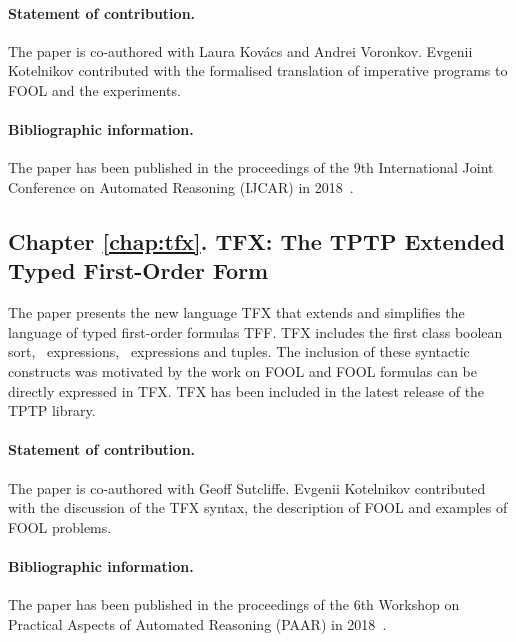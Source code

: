 \paragraph{Statement of contribution.} The paper is co-authored with Laura Kov\'{a}cs and Andrei Voronkov. Evgenii Kotelnikov contributed with the formalised translation of imperative programs to FOOL and the experiments.

\paragraph{Bibliographic information.} The paper has been published in the proceedings of the 9th International Joint Conference on Automated Reasoning (IJCAR) in 2018~\cite{KKV18}.

\subsection*{Chapter \ref{chap:tfx}. TFX: The TPTP Extended Typed First-Order Form}
The paper presents the new language TFX that extends and simplifies the language of typed first-order formulas TFF. TFX includes the first class boolean sort, \ITE\ expressions, \LETIN\ expressions and tuples. The inclusion of these syntactic constructs was motivated by the work on FOOL and FOOL formulas can be directly expressed in TFX. TFX has been included in the latest release of the TPTP library.

\paragraph{Statement of contribution.} The paper is co-authored with Geoff Sutcliffe. Evgenii Kotelnikov contributed with the discussion of the TFX syntax, the description of FOOL and examples of FOOL problems.

\paragraph{Bibliographic information.} The paper has been published in the proceedings of the 6th Workshop on Practical Aspects of Automated Reasoning (PAAR) in 2018~\cite{SutcliffeK18}.
